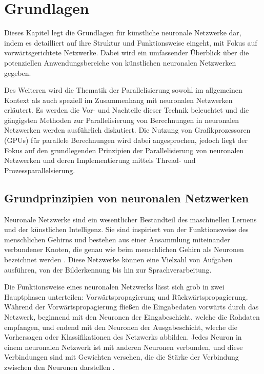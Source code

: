 \chapter{Grundlagen}
\label{ch:Grundlagen}

Dieses Kapitel legt die Grundlagen für künstliche neuronale Netzwerke dar, indem es detailliert auf ihre Struktur und Funktionsweise eingeht, mit Fokus auf vorwärtsgerichtete Netzwerke. Dabei wird ein umfassender Überblick über die potenziellen Anwendungsbereiche von künstlichen neuronalen Netzwerken gegeben.

Des Weiteren wird die Thematik der Parallelisierung sowohl im allgemeinen Kontext als auch speziell im Zusammenhang mit neuronalen Netzwerken erläutert. Es werden die Vor- und Nachteile dieser Technik beleuchtet und die gängigsten Methoden zur Parallelisierung von Berechnungen in neuronalen Netzwerken werden ausführlich diskutiert.
Die Nutzung von Grafikprozessoren (GPUs) für parallele Berechnungen wird dabei angesprochen, jedoch liegt der Fokus auf den grundlegenden Prinzipien der Parallelisierung von neuronalen Netzwerken und deren Implementierung mittels Thread- und Prozessparallelsierung.

\section{Grundprinzipien von neuronalen Netzwerken}
\label{sec:Grundlagen_Grundprinzipien_neuronale_Netze}
Neuronale Netzwerke sind ein wesentlicher Bestandteil des maschinellen Lernens und der künstlichen Intelligenz. Sie sind inspiriert von der Funktionsweise des menschlichen Gehirns und bestehen aus einer Ansammlung miteinander verbundener Knoten, die genau wie beim menschlichen Gehirn als Neuronen bezeichnet werden \citep{Manuela_Kunstliche_Intelligenz}. Diese Netzwerke können eine Vielzahl von Aufgaben ausführen, von der Bilderkennung bis hin zur Sprachverarbeitung.

Die Funktionsweise eines neuronalen Netzwerks lässt sich grob in zwei Hauptphasen unterteilen: Vorwärtspropagierung und Rückwärtspropagierung. Während der Vorwärtspropagierung fließen die Eingabedaten vorwärts durch das Netzwerk, beginnend mit den Neuronen der Eingabeschicht, welche die Rohdaten empfangen, und endend mit den Neuronen der Ausgabeschicht, wleche die Vorhersagen oder Klassifikationen des Netzwerks abbilden. Jedes Neuron in einem neuronalen Netzwerk ist mit anderen Neuronen verbunden, und diese Verbindungen sind mit Gewichten versehen, die die Stärke der Verbindung zwischen den Neuronen darstellen  \citep{Manuela_Kunstliche_Intelligenz}.

